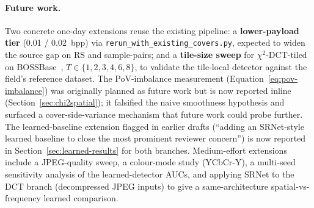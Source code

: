 \documentclass[10pt,twocolumn,a4paper]{article}
\begin{document}
\paragraph{Future work.} Two concrete one-day extensions reuse the existing pipeline: a \textbf{lower-payload tier} (0.01 / 0.02~bpp) via \texttt{rerun\_with\_existing\_covers.py}, expected to widen the source gap on RS and sample-pairs; and a \textbf{tile-size sweep} for $\chi^2$-DCT-tiled on BOSSBase~\cite{bas2011boss}, $T\!\in\!\{1,2,3,4,6,8\}$, to validate the tile-local detector against the field's reference dataset. The PoV-imbalance measurement (Equation~\ref{eq:pov-imbalance}) was originally planned as future work but is now reported inline (Section~\ref{sec:chi2spatial}); it falsified the naive smoothness hypothesis and surfaced a cover-side-variance mechanism that future work could probe further. The learned-baseline extension flagged in earlier drafts (``adding an SRNet-style learned baseline to close the most prominent reviewer concern'') is now reported in Section~\ref{sec:learned-results} for both branches. Medium-effort extensions include a JPEG-quality sweep, a colour-mode study (YCbCr-Y), a multi-seed sensitivity analysis of the learned-detector AUCs, and applying SRNet to the DCT branch (decompressed JPEG inputs) to give a same-architecture spatial-vs-frequency learned comparison.

\clearpage
\renewcommand{\refname}{References}
\end{document}
